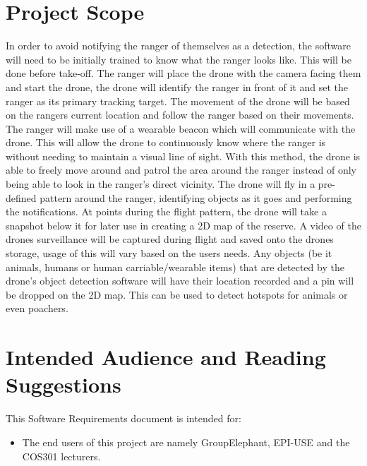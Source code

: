 \section{Project Scope}
\begin{flushleft}
	In order to avoid notifying the ranger of themselves as a detection, the software will need to be initially trained to know what the ranger looks like. 
	This will be done before take-off. The ranger will place the drone with the camera facing them and start the drone, 
	the drone will identify the ranger in front of it and set the ranger as its primary tracking target.
	\newline
	\newline
	The movement of the drone will be based on the rangers current location and follow the ranger based on their movements.
	The ranger will make use of a wearable beacon which will communicate with the drone. 
	This will allow the drone to continuously know where the ranger is without needing to maintain a visual line of sight. 
	With this method, the drone is able to freely move around and patrol the area around the ranger instead of only being 
	able to look in the ranger’s direct vicinity.
	\newline
	\newline
	The drone will fly in a pre-defined pattern around the ranger, identifying objects as it goes and performing the notifications.
	At points during the flight pattern, the drone will take a snapshot below it for later use in creating a 2D map of the reserve.
	A video of the drones surveillance will be captured during flight and saved onto the drones storage, usage of this will vary based on the users needs.
	Any objects (be it animals, humans or human carriable/wearable items) that are detected by the drone’s object detection software 
	will have their location recorded and a pin will be dropped on the 2D map. This can be used to detect hotspots for animals or even poachers.
	\newline
	\newline
\end{flushleft}
\section{Intended Audience and Reading Suggestions}
This Software Requirements document is intended for:

\begin{itemize}
	\item The end users of this project are namely GroupElephant, EPI-USE and the COS301 lecturers.
\end{itemize}
